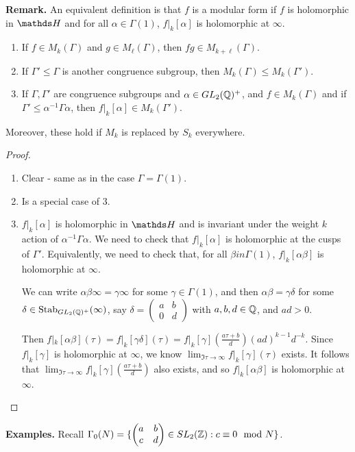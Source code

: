\documentclass[10pt,a4paper]{article}
\begin{document}
\textbf{Remark.} An equivalent definition is that $f$ is a modular form if $f$ is holomorphic in $\H$ and for all $\alpha \in \Gamma(1)$, $f|_k[\alpha]$ is holomorphic at $\infty$.

\begin{lemma}\hspace*{0cm}
  \begin{enumerate}
    \item If $f \in M_k(\Gamma)$ and $g \in M_\ell(\Gamma)$, then $fg \in M_{k+\ell}(\Gamma)$.
    \item If $\Gamma' \leq \Gamma$ is another congruence subgroup, then $M_k(\Gamma) \leq M_k(\Gamma')$.
    \item If $\Gamma, \Gamma'$ are congruence subgroups and $\alpha \in GL_2(\mathbb{Q})^+$, and $f \in M_k(\Gamma)$ and if $\Gamma' \leq \alpha^{-1}\Gamma\alpha$, then $f|_k[\alpha] \in M_k(\Gamma')$.
  \end{enumerate}
  Moreover, these hold if $M_k$ is replaced by $S_k$ everywhere.
\end{lemma}
\begin{proof}\hspace*{0cm}
  \begin{enumerate}
    \item Clear - same as in the case $\Gamma=\Gamma(1)$.
    \item Is a special case of 3.
    \item $f|_k[\alpha]$ is holomorphic in $\H$ and is invariant under the weight $k$ action of $\alpha^{-1}\Gamma\alpha$. We need to check that $f|_k[\alpha]$ is holomorphic at the cusps of $\Gamma'$. Equivalently, we need to check that, for all $\beta in \Gamma(1)$, $f|_k[\alpha\beta]$ is holomorphic at $\infty$.

    We can write $\alpha\beta\infty = \gamma \infty$ for some $\gamma \in \Gamma(1)$, and then $\alpha\beta = \gamma\delta$ for some $\delta \in \operatorname{Stab}_{GL_2(\mathbb{Q})^+}(\infty)$, say $\delta=\begin{pmatrix}a & b \\0 &d\end{pmatrix}$ with $a,b,d \in \mathbb{Q}$, and $ad>0$.

    Then $f|_k[\alpha\beta](\tau)=f|_k[\gamma\delta](\tau) = f|_k[\gamma](\frac{a\tau+b}{d})(ad)^{k-1}d^{-k}$. Since $f|_k[\gamma]$ is holomorphic at $\infty$, we know $\lim_{\Im \tau \to \infty}f|_k[\gamma](\tau)$ exists. It follows that $\lim_{\Im \tau \to \infty}f|_{k}[\gamma](\frac{a\tau+b}{d})$ also exists, and so $f|_k[\alpha\beta]$ is holomorphic at $\infty$.
  \end{enumerate}
\end{proof}
\textbf{Examples.} Recall $\Gamma_0(N) = \{\begin{pmatrix}a&b\\c&d\end{pmatrix}\in SL_2(\mathbb{Z}): c\equiv 0 \mod N\}$.
\end{document}
